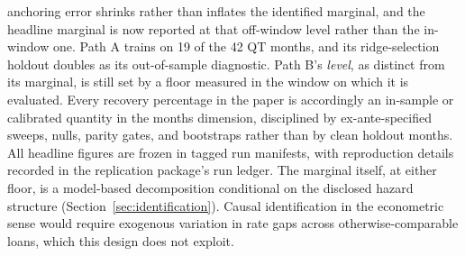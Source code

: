 \documentclass[12pt]{article}
\begin{document}
anchoring error shrinks rather than inflates the identified marginal, and the headline marginal is now reported at that off-window level rather than the in-window one. Path A trains on 19 of the 42 QT months, and its ridge-selection holdout doubles as its out-of-sample diagnostic. Path B's \emph{level}, as distinct from its marginal, is still set by a floor measured in the window on which it is evaluated. Every recovery percentage in the paper is accordingly an in-sample or calibrated quantity in the months dimension, disciplined by ex-ante-specified sweeps, nulls, parity gates, and bootstraps rather than by clean holdout months. All headline figures are frozen in tagged run manifests, with reproduction details recorded in the replication package's run ledger. The marginal itself, at either floor, is a model-based decomposition conditional on the disclosed hazard structure (Section~\ref{sec:identification}). Causal identification in the econometric sense would require exogenous variation in rate gaps across otherwise-comparable loans, which this design does not exploit.
\end{document}
